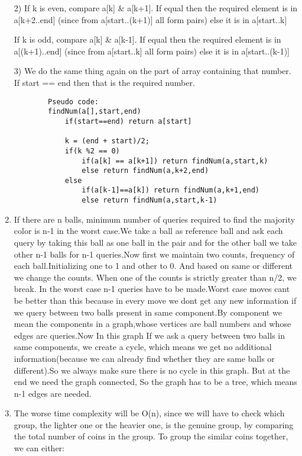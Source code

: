 \documentclass[12pt]{article}
\begin{document}
\begin{enumerate}
    2) If k is even, compare a[k] \& a[k+1]. If equal then the required element is in a[k+2..end] (since from a[start..(k+1)] all form pairs) else it is in a[start..k]
    
    If k is odd, compare a[k] \& a[k-1]. If equal then the required element is in a[(k+1)..end] (since from a[start..k] all form pairs) else it is in a[start..(k-1)]
    
    3) We do the same thing again on the part of array containing that number. If start == end then that is the required number.
    
    \begin{verbatim}
        Pseudo code:
        findNum(a[],start,end)
            if(start==end) return a[start]
            
            k = (end + start)/2;
            if(k %2 == 0) 
                if(a[k] == a[k+1]) return findNum(a,start,k)
                else return findNum(a,k+2,end)
            else 
                if(a[k-1]==a[k]) return findNum(a,k+1,end)
                else return findNum(a,start,k-1)
    \end{verbatim}
    \item
    If there are n balls, minimum number of queries required to find the majority color is n-1 in the worst case.We take a ball as reference ball and ask each query by taking this ball as one ball in the pair and for the other ball we take other n-1 balls for n-1 queries.Now first we maintain two counts, frequency of each ball.Initializing one to 1 and other to 0. And based on same or different we change the counts. When one of the counts is strictly greater than n/2, we break. In the worst case n-1 queries have to be made.Worst case moves cant be better than this because in every move we dont get any new information if we query between two balls present in same component.By component we mean the components in a graph,whose vertices are ball numbers and whose edges are queries.Now In this graph If we ask a query between two balls in same components, we create a cycle, which means we get no additional information(because we can already find whether they are same balls or different).So we always make sure there is no cycle in this graph. But at the end we need the graph connected, So the graph has to be a tree, which means n-1 edges are needed.
    \item
    The worse time complexity will be O(n), since we will have to check which group, the lighter one or the heavier one, is the genuine group, by comparing the total number of coins in the group. To group the similar coins together, we can either:

\end{enumerate}
\end{document}
